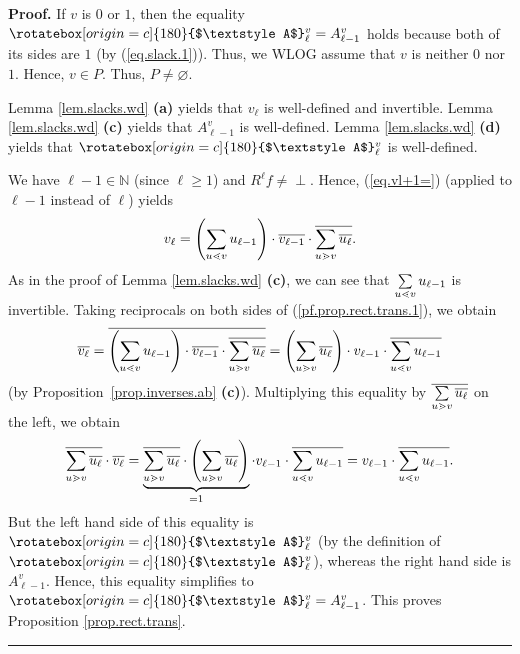 \documentclass[numbers=enddot,12pt,final,onecolumn,notitlepage]{scrartcl}%
\theoremstyle{definition}
\newenvironment{verlong}{}{}
\newcommand{\undf}{\operatorname*{\bot}}
\newcommand{\upslack}{\mathchoice{\rotatebox[origin=c]{180}{$\displaystyle A$}}{\rotatebox[origin=c]{180}{$\textstyle A$}}{\rotatebox[origin=c]{180}{$\scriptstyle A$}}{\rotatebox[origin=c]{180}{$\scriptscriptstyle A$}}}
\newcommand{\downslack}{A}
\newenvironment{proof}[1][Proof]{\noindent\textbf{#1.} }{\ \rule{0.5em}{0.5em}}
\let\sumnonlimits\sum
\renewcommand{\sum}{\sumnonlimits\limits}
\begin{document}
\begin{verlong}


\begin{proof}
If $v$ is $0$ or $1$, then the equality $\upslack_{\ell}^{v}=\downslack_{\ell
-1}^{v}$ holds because both of its sides are $1$ (by (\ref{eq.slack.1})).
Thus, we WLOG assume that $v$ is neither $0$ nor $1$. Hence, $v\in P$. Thus,
$P \neq\varnothing$.

Lemma \ref{lem.slacks.wd} \textbf{(a)} yields that $v_{\ell}$ is well-defined
and invertible. Lemma \ref{lem.slacks.wd} \textbf{(c)} yields that
$\downslack_{\ell-1}^{v}$ is well-defined. Lemma \ref{lem.slacks.wd}
\textbf{(d)} yields that $\upslack_{\ell}^{v}$ is well-defined.

We have $\ell-1\in\mathbb{N}$ (since $\ell\geq1$) and $R^{\ell}f\neq\undf$.
Hence, (\ref{eq.vl+1=}) (applied to $\ell-1$ instead of $\ell$) yields%
\begin{equation}
v_{\ell}=\left(  \sum\limits_{u\lessdot v}u_{\ell-1}\right)  \cdot
\overline{v_{\ell-1}}\cdot\overline{\sum\limits_{u\gtrdot v}\overline{u_{\ell
}}}. \label{pf.prop.rect.trans.1}%
\end{equation}
As in the proof of Lemma \ref{lem.slacks.wd} \textbf{(c)}, we can see that
$\sum\limits_{u\lessdot v}u_{\ell-1}$ is invertible. Taking reciprocals on
both sides of (\ref{pf.prop.rect.trans.1}), we obtain%
\[
\overline{v_{\ell}}=\overline{\left(  \sum\limits_{u\lessdot v}u_{\ell
-1}\right)  \cdot\overline{v_{\ell-1}}\cdot\overline{\sum\limits_{u\gtrdot
v}\overline{u_{\ell}}}}=\left(  \sum\limits_{u\gtrdot v}\overline{u_{\ell}%
}\right)  \cdot v_{\ell-1}\cdot\overline{\sum\limits_{u\lessdot v}u_{\ell-1}}%
\]
(by Proposition~\ref{prop.inverses.ab} \textbf{(c)}). Multiplying this
equality by $\overline{\sum\limits_{u\gtrdot v}\overline{u_{\ell}}}$ on the
left, we obtain%
\[
\overline{\sum\limits_{u\gtrdot v}\overline{u_{\ell}}}\cdot\overline{v_{\ell}%
}=\underbrace{\overline{\sum\limits_{u\gtrdot v}\overline{u_{\ell}}}%
\cdot\left(  \sum\limits_{u\gtrdot v}\overline{u_{\ell}}\right)  }_{=1}\cdot
v_{\ell-1}\cdot\overline{\sum\limits_{u\lessdot v}u_{\ell-1}}=v_{\ell-1}%
\cdot\overline{\sum\limits_{u\lessdot v}u_{\ell-1}}.
\]
But the left hand side of this equality is $\upslack_{\ell}^{v}$ (by the
definition of $\upslack_{\ell}^{v}$), whereas the right hand side is
$\downslack_{\ell-1}^{v}$. Hence, this equality simplifies to $\upslack_{\ell
}^{v}=\downslack_{\ell-1}^{v}$. This proves Proposition \ref{prop.rect.trans}.
\end{proof}
\end{verlong}
\end{document}
